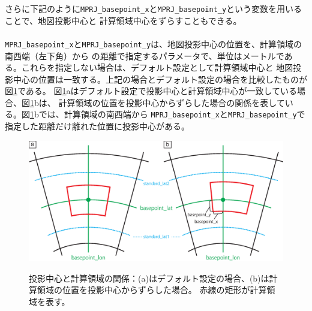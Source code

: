 さらに下記のように\verb|MPRJ_basepoint_x|と\verb|MPRJ_basepoint_y|という変数を用いることで、地図投影中心と
計算領域中心をずらすこともできる。\\

\\

\noindent \verb|MPRJ_basepoint_x|と\verb|MPRJ_basepoint_y|は、地図投影中心の位置を、計算領域の南西端（左下角）から
の距離で指定するパラメータで、単位はメートルである。これらを指定しない場合は、デフォルト設定として計算領域中心と
地図投影中心の位置は一致する。上記の場合とデフォルト設定の場合を比較したものが図\ref{fig:map_lc}である。
図\ref{fig:map_lc}aはデフォルト設定で投影中心と計算領域中心が一致している場合、図\ref{fig:map_lc}bは、
計算領域の位置を投影中心からずらした場合の関係を表している。図\ref{fig:map_lc}bでは、計算領域の南西端から
\verb|MPRJ_basepoint_x|と\verb|MPRJ_basepoint_y|で指定した距離だけ離れた位置に投影中心がある。

\begin{figure}[t]
\begin{center}
  \includegraphics[width=0.8\hsize]{./figure/LC_latlon_xy.eps}\\
  \caption{投影中心と計算領域の関係：(a)はデフォルト設定の場合、(b)は計算領域の位置を投影中心からずらした場合。
  赤線の矩形が計算領域を表す。}
  \label{fig:map_lc}
\end{center}
\end{figure}



